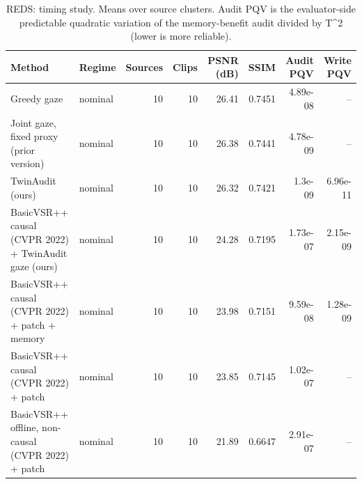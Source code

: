\begin{table}[t]
\centering
\caption{REDS: timing study. Means over source clusters. Audit PQV is the evaluator-side predictable quadratic variation of the memory-benefit audit divided by T^2 (lower is more reliable).}
\label{tab:timing_REDS}
\small
\begin{tabular}{llrrrrrr}
\toprule
Method & Regime & Sources & Clips & PSNR (dB) & SSIM & Audit PQV & Write PQV \\
\midrule
Greedy gaze & nominal & 10 & 10 & 26.41 & 0.7451 & 4.89e-08 & -- \\
Joint gaze, fixed proxy (prior version) & nominal & 10 & 10 & 26.38 & 0.7441 & 4.78e-09 & -- \\
TwinAudit (ours) & nominal & 10 & 10 & 26.32 & 0.7421 & 1.3e-09 & 6.96e-11 \\
BasicVSR++ causal (CVPR 2022) + TwinAudit gaze (ours) & nominal & 10 & 10 & 24.28 & 0.7195 & 1.73e-07 & 2.15e-09 \\
BasicVSR++ causal (CVPR 2022) + patch + memory & nominal & 10 & 10 & 23.98 & 0.7151 & 9.59e-08 & 1.28e-09 \\
BasicVSR++ causal (CVPR 2022) + patch & nominal & 10 & 10 & 23.85 & 0.7145 & 1.02e-07 & -- \\
BasicVSR++ offline, non-causal (CVPR 2022) + patch & nominal & 10 & 10 & 21.89 & 0.6647 & 2.91e-07 & -- \\
\bottomrule
\end{tabular}
\end{table}
